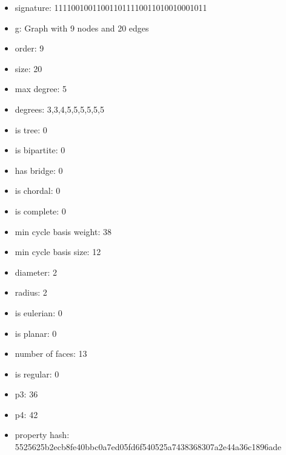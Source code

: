 \newpage
\begin{figure}
\end{figure}
\begin{itemize}
\item signature: 111100100110011011110011010010001011
\item g: Graph with 9 nodes and 20 edges
\item order: 9
\item size: 20
\item max degree: 5
\item degrees: 3,3,4,5,5,5,5,5,5
\item is tree: 0
\item is bipartite: 0
\item has bridge: 0
\item is chordal: 0
\item is complete: 0
\item min cycle basis weight: 38
\item min cycle basis size: 12
\item diameter: 2
\item radius: 2
\item is eulerian: 0
\item is planar: 0
\item number of faces: 13
\item is regular: 0
\item p3: 36
\item p4: 42
\item property hash: 5525625b2ecb8fe40bbc0a7ed05fd6f540525a7438368307a2e44a36c1896ade
\end{itemize}
